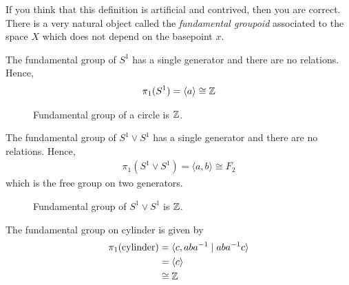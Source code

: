 \begin{remark}
  If you think that this definition is artificial and contrived, then you are correct. There is a very natural object called the \emph{fundamental groupoid} associated to the space $X$ which does not depend on the basepoint $x$.
\end{remark}


  \begin{ex}
    The fundamental group of $S^1$ has a single generator and there are no relations.
    Hence,
    \begin{align*}
      \pi_1(S^1) = \langle a \rangle \cong \bbz
    \end{align*}
    \begin{figure}[H]
    \centering
      \begin{tikzpicture}[scale=0.5]
        
      \end{tikzpicture}
      \caption{Fundamental group of a circle is $\bbz$.}
    \end{figure}
  \end{ex}

  \begin{ex}
    The fundamental group of $S^1 \vee S^1$ has a single generator and there are no relations.
    Hence,
    \begin{align*}
      \pi_1(S^1 \vee S^1) = \langle a, b \rangle \cong F_2
    \end{align*}
    which is the free group on two generators.
    \begin{figure}[H]
    \centering
      \begin{tikzpicture}[scale=0.5]
        
      \end{tikzpicture}
      \caption{Fundamental group of $S^1 \vee S^1$ is $\bbz$.}
    \end{figure}
  \end{ex}

  \begin{ex}
    The fundamental group on cylinder is given by
    \begin{align*}
      \pi_1(\mbox{cylinder})
      &= \langle c, a b a^{-1} \mid  a b a^{-1} c\rangle \\
      &= \langle c \rangle \\
      &\cong \bbz
    \end{align*}
  \end{ex}

